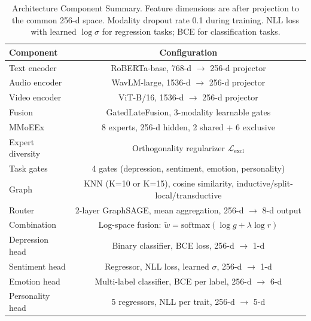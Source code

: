 \begin{table}[htbp]
\centering
\caption{Architecture Component Summary. Feature dimensions are after projection to the common 256-d space. Modality dropout rate 0.1 during training. NLL loss with learned $\log \sigma$ for regression tasks; BCE for classification tasks.}
\label{tab:architecture_summary}
\begin{tabular}{lc}
\toprule
Component & Configuration \\
\midrule
Text encoder & RoBERTa-base, 768-d $\to$ 256-d projector \\
Audio encoder & WavLM-large, 1536-d $\to$ 256-d projector \\
Video encoder & ViT-B/16, 1536-d $\to$ 256-d projector \\
Fusion & GatedLateFusion, 3-modality learnable gates \\
MMoEEx & 8 experts, 256-d hidden, 2 shared + 6 exclusive \\
Expert diversity & Orthogonality regularizer $\mathcal{L}_{\text{excl}}$ \\
Task gates & 4 gates (depression, sentiment, emotion, personality) \\
Graph & KNN (K=10 or K=15), cosine similarity, inductive/split-local/transductive \\
Router & 2-layer GraphSAGE, mean aggregation, 256-d $\to$ 8-d output \\
Combination & Log-space fusion: $\tilde{w} = \text{softmax}(\log g + \lambda \log r)$ \\
Depression head & Binary classifier, BCE loss, 256-d $\to$ 1-d \\
Sentiment head & Regressor, NLL loss, learned $\sigma$, 256-d $\to$ 1-d \\
Emotion head & Multi-label classifier, BCE per label, 256-d $\to$ 6-d \\
Personality head & 5 regressors, NLL per trait, 256-d $\to$ 5-d \\
\bottomrule
\end{tabular}
\end{table}